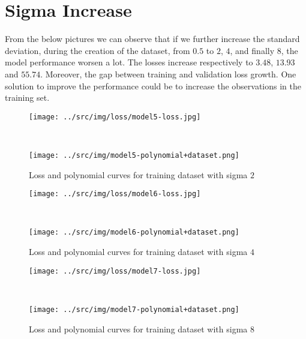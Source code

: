 \documentclass[a4paper,12pt]{article} %
\begin{document}
	\section{Sigma Increase}
	From the below pictures we can observe that if we further increase the  
	standard deviation, during the creation of the dataset, from $0.5$ to $2$, 
	$4$, and finally $8$, the model performance worsen a lot. The losses 
	increase respectively to $3.48$, $13.93$ and $55.74$. Moreover, the 
	gap between training and validation loss growth.
	One solution to improve the performance could be to increase the 
	observations in the training set.
	
	\begin{figure}[H]
		\begin{minipage}[c]{.49\textwidth}
			\centering
			\texttt{[image: ../src/img/loss/model5-loss.jpg]}
		\end{minipage}
		~
		\begin{minipage}[c]{.49\textwidth}
			\centering
			\texttt{[image: ../src/img/model5-polynomial+dataset.png]}
		\end{minipage}
		\caption{Loss and polynomial curves for training dataset with sigma $2$}
	\end{figure}
	
	\begin{figure}[H]
		\begin{minipage}[c]{.49\textwidth}
			\centering
			\texttt{[image: ../src/img/loss/model6-loss.jpg]}
		\end{minipage}
		~
		\begin{minipage}[c]{.49\textwidth}
			\centering
			\texttt{[image: ../src/img/model6-polynomial+dataset.png]}
		\end{minipage}
	\caption{Loss and polynomial curves for training dataset with sigma $4$}
	\end{figure}
	
	\begin{figure}[H]
		\begin{minipage}[c]{.49\textwidth}
			\centering
			\texttt{[image: ../src/img/loss/model7-loss.jpg]}
		\end{minipage}
		~
		\begin{minipage}[c]{.49\textwidth}
			\centering
			\texttt{[image: ../src/img/model7-polynomial+dataset.png]}
		\end{minipage}
	\caption{Loss and polynomial curves for training dataset with sigma $8$}
	\end{figure}
	
\end{document}
